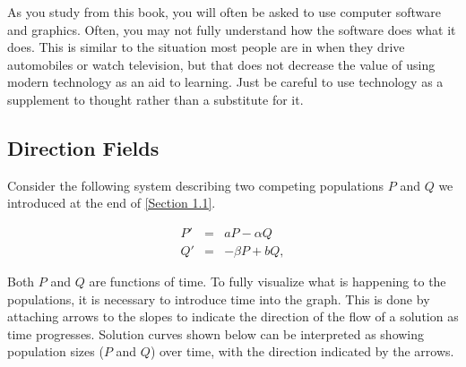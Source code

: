 \documentclass{ximera}
\begin{document}
As you study from this book, you will often be asked to use
computer software and graphics.
Often, you may not fully understand how the software does what it does.
This is similar to the situation most people are in when they drive
automobiles or watch television, but that does not decrease the value
of using modern technology as an aid to learning. Just be careful to use technology as a supplement to thought rather than a
substitute for it.


\subsection*{Direction Fields}

Consider the following system describing two competing populations $P$ and $Q$ we introduced at the end of \ref{Section 1.1}.

\begin{eqnarray*}
P'&=&aP-\alpha Q\\
Q'&=&-\beta P+bQ,
\end{eqnarray*}

Both $P$ and $Q$ are functions of time. To fully visualize what is happening to the populations, it is necessary to introduce time into the graph.  This is done by attaching arrows to the slopes to indicate the direction of the flow of a solution as time progresses.  Solution curves shown below can be interpreted as showing population sizes ($P$ and $Q$) over time, with the direction indicated by the arrows.  

\begin{center}  
\end{center}
\end{document}

